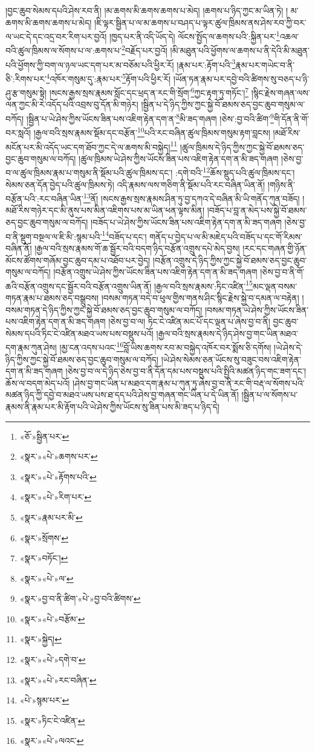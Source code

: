 །བྱང་ཆུབ་སེམས་དཔའི་ཤེས་རབ་ནི། །མ་ཆགས་མི་ཆགས་ཆགས་པ་མེད། །ཆགས་པ་ཉིད་ཀྱང་མ་ཡིན་ཏེ། །
མ་ཆགས་མི་ཆགས་ཆགས་པ་མེད། །ཇི་ལྟར་སྦྱིན་པ་ལ་མ་ཆགས་པ་བཤད་པ་ལྟར་ཚུལ་ཁྲིམས་ནས་ཤེས་རབ་ཀྱི་བར་ལ་ཡང་དེ་དང་འདྲ་བར་རིག་པར་བྱའོ། །ཁྱད་པར་ནི་འདི་ཡོད་དེ། ལོངས་སྤྱོད་ལ་ཆགས་པའི་:སྐྱིན་པར་\footnote{«ཅོ་»སྦྱིན་པར་}འཆལ་བའི་ཚུལ་ཁྲིམས་ལ་སོགས་པ་ལ་:ཆགས་པ་\footnote{«སྣར་»«པེ་»ཆགས་པར་}བརྗོད་པར་བྱའོ། །མི་མཐུན་པའི་ཕྱོགས་ལ་ཆགས་པ་ནི་དེའི་མི་མཐུན་པའི་ཕྱོགས་ཀྱི་བག་ལ་ཉལ་ཡང་དག་པར་མ་བཅོམ་པའི་ཕྱིར་རོ། །རྣམ་པར་:རྟོག་པའི་\footnote{«སྣར་»«པེ་»རྟོགས་པའི་}རྣམ་པར་གཡེང་བ་ནི་ཅི་:རིགས་པར་\footnote{«སྣར་»«པེ་»རིག་པར་}འཁོར་གསུམ་དུ་:རྣམ་པར་\footnote{«སྣར་»རྣམ་པར་མི་}རྟོག་པའི་ཕྱིར་རོ། །ཡོན་ཏན་རྣམ་པར་དབྱེ་བའི་ཚིགས་སུ་བཅད་པ་ཉི་ཤུ་རྩ་གསུམ་སྟེ། །སངས་རྒྱས་སྲས་རྣམས་སློང་དང་ཕྲད་ན་རང་གི་སྲོག་\footnote{«སྣར་»སྲོགས་}ཀྱང་རྟག་ཏུ་གཏོང་།\footnote{«སྣར་»བཏོང་།} །སྙིང་རྗེས་གཞན་ལས་ལན་ཀྱང་མི་རེ་འདོད་པའི་འབྲས་བུ་དོན་མི་གཉེར། །སྦྱིན་པ་དེ་ཉིད་ཀྱིས་ཀྱང་སྐྱེ་བོ་ཐམས་ཅད་བྱང་ཆུབ་གསུམ་ལ་བཀོད། །སྦྱིན་པ་ཡེ་ཤེས་ཀྱིས་ཡོངས་ཟིན་པས་འཇིག་རྟེན་དག་ན་\footnote{«སྣར་»«པེ་»ལ་}མི་ཟད་གཞག །ཅེས་:བྱ་བའི་ཚིག་\footnote{«སྣར་»བྱ་བ་ནི་ཚིག་«པེ་»བྱ་བའི་ཚིགས་}གི་དོན་ནི་གོ་བར་སླའོ། །རྒྱལ་བའི་སྲས་རྣམས་སྡོམ་དང་བརྩོན་\footnote{«སྣར་»«པེ་»བརྩོམ་}པའི་རང་བཞིན་ཚུལ་ཁྲིམས་གསུམ་རྟག་བླངས། །མཐོ་རིས་མངོན་པར་མི་འདོད་ཡང་དག་ཐོབ་ཀྱང་དེ་ལ་ཆགས་མི་བསྐྱེད།\footnote{«སྣར་»སྐྱེད།} །ཚུལ་ཁྲིམས་དེ་ཉིད་ཀྱིས་ཀྱང་སྐྱེ་བོ་ཐམས་ཅད་བྱང་ཆུབ་གསུམ་ལ་བཀོད། །ཚུལ་ཁྲིམས་ཡེ་ཤེས་ཀྱིས་ཡོངས་ཟིན་པས་འཇིག་རྟེན་དག་ན་མི་ཟད་གཞག །ཅེས་བྱ་བ་ལ་ཚུལ་ཁྲིམས་རྣམ་པ་གསུམ་ནི་སྡོམ་པའི་ཚུལ་ཁྲིམས་དང་། :དགེ་བའི་\footnote{«སྣར་»«པེ་»དགེ་བ་}ཆོས་སྡུད་པའི་ཚུལ་ཁྲིམས་དང་། སེམས་ཅན་དོན་བྱེད་པའི་ཚུལ་ཁྲིམས་ཏེ། འདི་རྣམས་ལས་གཅིག་ནི་སྡོམ་པའི་རང་བཞིན་ཡིན་ནོ། །གཉིས་ནི་བརྩོན་པའི་:རང་བཞིན་ཡིན་\footnote{«སྣར་»«པེ་»རང་བཞིན་}ནོ། །སངས་རྒྱས་སྲས་རྣམས་ཤིན་ཏུ་བྱ་དཀའ་དེ་བཞིན་མི་ཡི་གནོད་ཀུན་བཟོད། །མཐོ་རིས་གཉེར་དང་མི་ནུས་པས་མིན་འཇིགས་པས་མ་ཡིན་ཕན་ལྟས་མིན། །བཟོད་པ་བླ་ན་མེད་པས་སྐྱེ་བོ་ཐམས་ཅད་བྱང་ཆུབ་གསུམ་ལ་བཀོད། །བཟོད་པ་ཡེ་ཤེས་ཀྱིས་ཡོངས་ཟིན་པས་འཇིག་རྟེན་དག་ན་མི་ཟད་གཞག །ཅེས་བྱ་བ་ནི་སྡུག་བསྔལ་ལ་ཇི་མི་:སྙམ་པའི་\footnote{«པེ་»སྙམ་པར་}བཟོད་པ་དང་། གནོད་པ་བྱེད་པ་ལ་མི་མཇེད་པའི་བཟོད་པ་དང་གོ་རིམས་བཞིན་ནོ། །རྒྱལ་བའི་སྲས་རྣམས་གོ་ཆ་སྦྱོར་བའི་བདག་ཉིད་བརྩོན་འགྲུས་དཔེ་མེད་བྱས། །རང་དང་གཞན་གྱི་ཉོན་མོངས་ཚོགས་གཞོམ་བྱང་ཆུབ་དམ་པ་འཐོབ་པར་བྱེད། །བརྩོན་འགྲུས་དེ་ཉིད་ཀྱིས་ཀྱང་སྐྱེ་བོ་ཐམས་ཅད་བྱང་ཆུབ་གསུམ་ལ་བཀོད། །བརྩོན་འགྲུས་ཡེ་ཤེས་ཀྱིས་ཡོངས་ཟིན་པས་འཇིག་རྟེན་དག་ན་མི་ཟད་གཞག །ཅེས་བྱ་བ་ནི་གོ་ཆའི་བརྩོན་འགྲུས་དང་སྦྱོར་བའི་བརྩོན་འགྲུས་ཡིན་ནོ། །རྒྱལ་བའི་སྲས་རྣམས་:ཏིང་འཛིན་\footnote{«སྣར་»ཏིང་ངེ་འཛིན་}མང་ལྡན་བསམ་གཏན་རྣམ་པ་ཐམས་ཅད་བསྒྲུབས། །བསམ་གཏན་བདེ་བ་ཕུལ་གྱིས་གནས་ཤིང་སྙིང་རྗེས་སྐྱེ་བ་དམན་ལ་བརྟེན། །བསམ་གཏན་དེ་ཉིད་ཀྱིས་ཀྱང་སྐྱེ་བོ་ཐམས་ཅད་བྱང་ཆུབ་གསུམ་ལ་བཀོད། །བསམ་གཏན་ཡེ་ཤེས་ཀྱིས་ཡོངས་ཟིན་པས་འཇིག་རྟེན་དག་ན་མི་ཟད་གཞག །ཅེས་བྱ་བ་ལ། ཏིང་ངེ་འཛིན་མང་པོ་དང་ལྡན་པ་ཞེས་བྱ་བ་ནི། བྱང་ཆུབ་སེམས་དཔའི་ཏིང་ངེ་འཛིན་མཐའ་ཡས་པས་བསྡུས་པའོ། །རྒྱལ་བའི་སྲས་རྣམས་དེ་ཉིད་ཤེས་བྱ་གང་ཡིན་མཐའ་དག་རྣམ་ཀུན་ཤེས། །མྱ་ངན་འདས་པའང་\footnote{«སྣར་»«པེ་»ལའང་}བློ་ཡིས་ཆགས་རབ་མ་བསྐྱེད་འཁོར་བར་སྨོས་ཅི་དགོས། །ཡེ་ཤེས་དེ་ཉིད་ཀྱིས་ཀྱང་སྐྱེ་བོ་ཐམས་ཅད་བྱང་ཆུབ་གསུམ་ལ་བཀོད། །ཡེ་ཤེས་སེམས་ཅན་ཡོངས་སུ་བཟུང་བས་འཇིག་རྟེན་དག་ན་མི་ཟད་གཞག །ཅེས་བྱ་བ་ལ་དེ་ཉིད་ཅེས་བྱ་བ་ནི་དོན་དམ་པས་བསྡུས་པའི་སྤྱིའི་མཚན་ཉིད་གང་ཟག་དང་། ཆོས་ལ་བདག་མེད་པའོ། །ཤེས་བྱ་གང་ཡིན་པ་མཐའ་དག་རྣམ་པ་ཀུན་ཏུ་ཞེས་བྱ་བ་ནི་རང་གི་བརྡ་ལ་སོགས་པའི་མཚན་ཉིད་ཀྱི་དབྱེ་བ་མཐའ་ཡས་པས་ཐ་དད་པའི་ཤེས་བྱ་གཞན་གང་ཡིན་པ་དེ་ཡིན་ནོ། །སྦྱིན་པ་ལ་སོགས་པ་རྣམས་ནི་རྣམ་པར་མི་རྟོག་པའི་ཡེ་ཤེས་ཀྱིས་ཡོངས་སུ་ཟིན་པས་མི་ཟད་པ་ཉིད་དེ། 